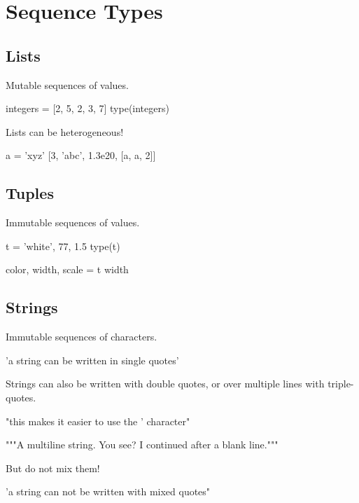 \documentclass[aspectratio=1610,slidestop]{beamer}
\begin{document}
\section{Sequence Types}
\makeTableOfContentsSection

\subsection{Lists}
\begin{pframe}
Mutable sequences of values.
\begin{pyconsole}
integers = [2, 5, 2, 3, 7]
type(integers)
\end{pyconsole}
\medskip
\medskip
Lists can be heterogeneous!
\begin{pyconsole}
a = 'xyz'
[3, 'abc', 1.3e20, [a, a, 2]]
\end{pyconsole}
\end{pframe}


\subsection{Tuples}
\begin{pframe}
Immutable sequences of values.
\begin{pyconsole}
t = 'white', 77, 1.5
type(t)

color, width, scale = t
width
\end{pyconsole}
\end{pframe}


\subsection{Strings}
\begin{pframe}
Immutable sequences of characters.
\begin{pyconsole}
'a string can be written in single quotes'
\end{pyconsole}
\medskip
\medskip
Strings can also be written with double quotes, or over multiple lines with
triple-quotes.
\begin{pyconsole}
"this makes it easier to use the ' character"
\end{pyconsole}
\medskip
\begin{pyconsole}
"""A multiline string.
You see? I continued after a blank line."""
\end{pyconsole}
\end{pframe}

\begin{pframe}
But do not mix them!
\begin{pyconsole}
'a string can not be written with mixed quotes"
\end{pyconsole}
\end{pframe}
\end{document}
